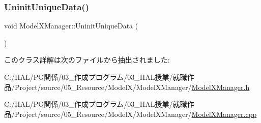 \subsubsection{\texorpdfstring{Uninit\+Unique\+Data()}{UninitUniqueData()}}
{\footnotesize\ttfamily void Model\+X\+Manager\+::\+Uninit\+Unique\+Data (\begin{DoxyParamCaption}{ }\end{DoxyParamCaption})\hspace{0.3cm}{\ttfamily [static]}}



このクラス詳解は次のファイルから抽出されました\+:\begin{DoxyCompactItemize}
\item 
C\+:/\+H\+A\+L/\+P\+G関係/03\+\_\+作成プログラム/03\+\_\+\+H\+A\+L授業/就職作品/\+Project/source/05\+\_\+\+Resource/\+Model\+X/\+Model\+X\+Manager/\mbox{\hyperlink{_model_x_manager_8h}{Model\+X\+Manager.\+h}}\item 
C\+:/\+H\+A\+L/\+P\+G関係/03\+\_\+作成プログラム/03\+\_\+\+H\+A\+L授業/就職作品/\+Project/source/05\+\_\+\+Resource/\+Model\+X/\+Model\+X\+Manager/\mbox{\hyperlink{_model_x_manager_8cpp}{Model\+X\+Manager.\+cpp}}\end{DoxyCompactItemize}

